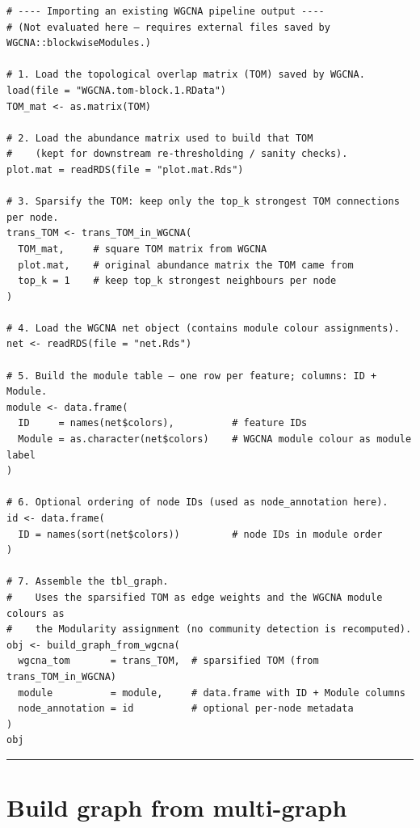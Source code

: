 \documentclass[
]{book}
\begin{document}
\begin{verbatim}
# ---- Importing an existing WGCNA pipeline output ----
# (Not evaluated here — requires external files saved by WGCNA::blockwiseModules.)

# 1. Load the topological overlap matrix (TOM) saved by WGCNA.
load(file = "WGCNA.tom-block.1.RData")
TOM_mat <- as.matrix(TOM)

# 2. Load the abundance matrix used to build that TOM
#    (kept for downstream re-thresholding / sanity checks).
plot.mat = readRDS(file = "plot.mat.Rds")

# 3. Sparsify the TOM: keep only the top_k strongest TOM connections per node.
trans_TOM <- trans_TOM_in_WGCNA(
  TOM_mat,     # square TOM matrix from WGCNA
  plot.mat,    # original abundance matrix the TOM came from
  top_k = 1    # keep top_k strongest neighbours per node
)

# 4. Load the WGCNA net object (contains module colour assignments).
net <- readRDS(file = "net.Rds")

# 5. Build the module table — one row per feature; columns: ID + Module.
module <- data.frame(
  ID     = names(net$colors),          # feature IDs
  Module = as.character(net$colors)    # WGCNA module colour as module label
)

# 6. Optional ordering of node IDs (used as node_annotation here).
id <- data.frame(
  ID = names(sort(net$colors))         # node IDs in module order
)

# 7. Assemble the tbl_graph.
#    Uses the sparsified TOM as edge weights and the WGCNA module colours as
#    the Modularity assignment (no community detection is recomputed).
obj <- build_graph_from_wgcna(
  wgcna_tom       = trans_TOM,  # sparsified TOM (from trans_TOM_in_WGCNA)
  module          = module,     # data.frame with ID + Module columns
  node_annotation = id          # optional per-node metadata
)
obj
\end{verbatim}

\begin{center}\rule{0.5\linewidth}{0.5pt}\end{center}

\section{Build graph from multi-graph}\label{build-graph-from-multi-graph}
\end{document}
